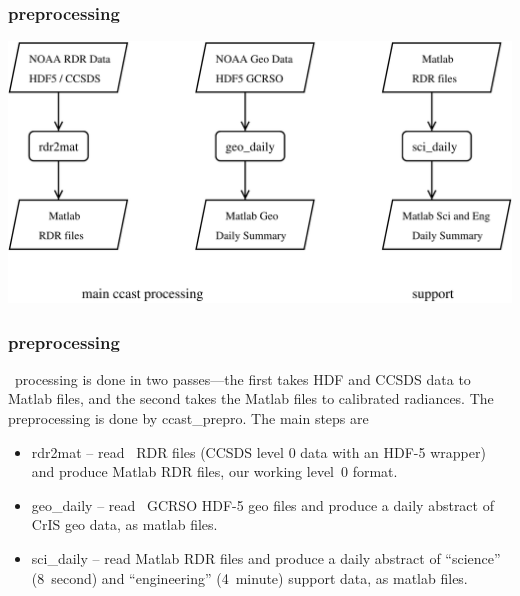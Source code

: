 \documentclass[11pt]{beamer}
\begin{document}
\begin{frame}
\frametitle{preprocessing}

\begin{center}
  \includegraphics[scale=0.4]{figures/prepro.pdf}
\end{center}

\end{frame}
\begin{frame}
\frametitle{preprocessing}

\ccast\ processing is done in two passes---the first takes HDF and
CCSDS data to Matlab files, and the second takes the Matlab files to
calibrated radiances.  The preprocessing is done by ccast\_prepro.
The main steps are

\begin{itemize}
  \item rdr2mat -- read \noaa\ RDR files (CCSDS level 0 data with an
    HDF-5 wrapper) and produce Matlab RDR files, our working level~0
    format.

  \item geo\_daily -- read \noaa\ GCRSO HDF-5 geo files and produce a
    daily abstract of CrIS geo data, as matlab files.

  \item sci\_daily -- read Matlab RDR files and produce a daily
    abstract of ``science'' (8~second) and ``engineering''
    (4~minute) support data, as matlab files.

\end{itemize}

\end{frame}
\end{document}
